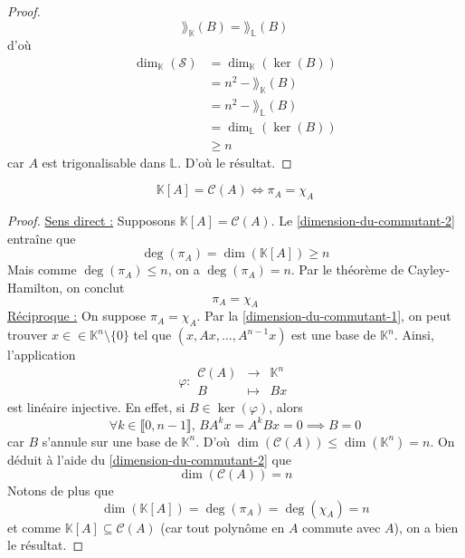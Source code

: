 \begin{proof}
    \[ \rang_{\mathbb{K}}(B) = \rang_{\mathbb{L}}(B) \]
    d'où
    \begin{align*}
      \dim_{\mathbb{K}}(\mathcal{S}) &= \dim_{\mathbb{K}}(\ker(B)) \\
      &= n^2 - \rang_{\mathbb{K}}(B) \\
      &= n^2 - \rang_{\mathbb{L}}(B) \\
      &= \dim_{\mathbb{L}}(\ker(B)) \\
      &\geq n
    \end{align*}
    car $A$ est trigonalisable dans $\mathbb{L}$. D'où le résultat.
  \end{proof}

  \begin{theorem}
    \[ \mathbb{K}[A] = \mathcal{C}(A) \iff \pi_A = \chi_A \]
  \end{theorem}

  \begin{proof}
    \uline{Sens direct :} Supposons $\mathbb{K}[A] = \mathcal{C}(A)$. Le \cref{dimension-du-commutant-2} entraîne que
    \[ \deg(\pi_A) = \dim(\mathbb{K}[A]) \geq n \]
    Mais comme $\deg(\pi_A) \leq n$, on a $\deg(\pi_A) = n$. Par le théorème de Cayley-Hamilton, on conclut
    \[ \pi_A = \chi_A \]
    \uline{Réciproque :} On suppose $\pi_A = \chi_A$. Par la \cref{dimension-du-commutant-1}, on peut trouver $x \in \in \mathbb{K}^n \setminus \{ 0 \}$ tel que $(x, Ax, \dots, A^{n-1}x)$ est une base de $\mathbb{K}^n$. Ainsi, l'application
    \[ \varphi :
    \begin{array}{ccc}
      \mathcal{C}(A) &\rightarrow& \mathbb{K}^n \\
      B &\mapsto& Bx
    \end{array}
    \]
    est linéaire injective. En effet, si $B \in \ker(\varphi)$, alors
    \[ \forall k \in \llbracket 0, n-1 \rrbracket, \, BA^kx = A^kBx = 0 \implies B = 0 \]
    car $B$ s'annule sur une base de $\mathbb{K}^n$. D'où $\dim(\mathcal{C}(A)) \leq \dim(\mathbb{K}^n) = n$. On déduit à l'aide du \cref{dimension-du-commutant-2} que
    \[ \dim(\mathcal{C}(A)) = n \]
    Notons de plus que
    \[ \dim(\mathbb{K}[A]) = \deg(\pi_A) = \deg(\chi_A) = n \]
    et comme $\mathbb{K}[A] \subseteq \mathcal{C}(A)$ (car tout polynôme en $A$ commute avec $A$), on a bien le résultat.
  \end{proof}

